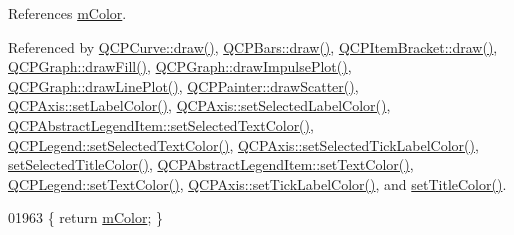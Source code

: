 References \hyperlink{a00116_source_l02114}{m\+Color}.



Referenced by \hyperlink{a00115_source_l09487}{Q\+C\+P\+Curve\+::draw()}, \hyperlink{a00115_source_l10153}{Q\+C\+P\+Bars\+::draw()}, \hyperlink{a00115_source_l14568}{Q\+C\+P\+Item\+Bracket\+::draw()}, \hyperlink{a00115_source_l01421}{Q\+C\+P\+Graph\+::draw\+Fill()}, \hyperlink{a00115_source_l01537}{Q\+C\+P\+Graph\+::draw\+Impulse\+Plot()}, \hyperlink{a00115_source_l01493}{Q\+C\+P\+Graph\+::draw\+Line\+Plot()}, \hyperlink{a00115_source_l13300}{Q\+C\+P\+Painter\+::draw\+Scatter()}, \hyperlink{a00115_source_l04302}{Q\+C\+P\+Axis\+::set\+Label\+Color()}, \hyperlink{a00115_source_l04377}{Q\+C\+P\+Axis\+::set\+Selected\+Label\+Color()}, \hyperlink{a00115_source_l08956}{Q\+C\+P\+Abstract\+Legend\+Item\+::set\+Selected\+Text\+Color()}, \hyperlink{a00115_source_l03009}{Q\+C\+P\+Legend\+::set\+Selected\+Text\+Color()}, \hyperlink{a00115_source_l04367}{Q\+C\+P\+Axis\+::set\+Selected\+Tick\+Label\+Color()}, \hyperlink{a00115_source_l06372}{set\+Selected\+Title\+Color()}, \hyperlink{a00115_source_l08934}{Q\+C\+P\+Abstract\+Legend\+Item\+::set\+Text\+Color()}, \hyperlink{a00115_source_l02665}{Q\+C\+P\+Legend\+::set\+Text\+Color()}, \hyperlink{a00115_source_l04018}{Q\+C\+P\+Axis\+::set\+Tick\+Label\+Color()}, and \hyperlink{a00115_source_l05902}{set\+Title\+Color()}.


\begin{DoxyCode}
01963 \{ \textcolor{keywordflow}{return} \hyperlink{a00116_ac071280171e215ffc7d416118bc28d90}{mColor}; \}
\end{DoxyCode}


